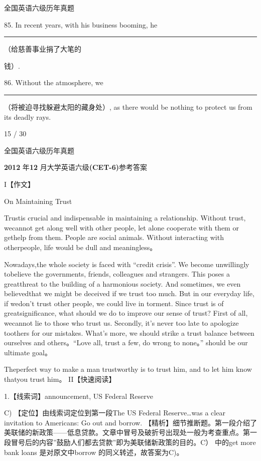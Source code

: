 \documentclass[UTF8,11pt]{ctexart}
\begin{document}
全国英语六级历年真题


85. In recent years, with his business booming, he \par\noindent\rule{.95\linewidth}{.4pt}\par  （给慈善事业捐了大笔的


钱）.


86. Without the atmosphere, we\par\noindent\rule{.95\linewidth}{.4pt}\par  （将被迫寻找躲避太阳的藏身处）, as there would be nothing to protect us from its deadly rays.


15 / 30


全国英语六级历年真题


\textbf{2012} 年\textbf{12} 月大学英语六级\textbf{(CET-6)}参考答案


I【作文】


On Maintaining Trust


Trustis crucial and indispensable in maintaining a relationship. Without trust, wecannot get along well with other people, let alone cooperate with them or gethelp from them. People are social animals. Without interacting with otherpeople, life would be dull and meaningless。


Nowadays,the whole society is faced with “credit crisis”. We become unwillingly tobelieve the governments, friends, colleagues and strangers. This poses a greatthreat to the building of a harmonious society. And sometimes, we even believedthat we might be deceived if we trust too much. But in our everyday life, if wedon’t trust other people, we could live in torment. Since trust is of greatsignificance, what should we do to improve our sense of trust? First of all, wecannot lie to those who trust us. Secondly, it’s never too late to apologize toothers for our mistakes. What’s more, we should strike a trust balance between ourselves and others。“Love all, trust a few, do wrong to none。” should be our ultimate goal。


Theperfect way to make a man trustworthy is to trust him, and to let him know thatyou trust him。 II【快速阅读】


1.【线索词】announcement, US Federal Reserve


C) 【定位】由线索词定位到第一段The US Federal Reserve…was a clear invitation to Americans: Go out and borrow. 【精析】细节推断题。第一段介绍了美联储的新政策——低息贷款。文章中冒号及破折号出现处一般为考查重点。第一段冒号后的内容”鼓励人们都去贷款”即为美联储新政策的目的。C） 中的get more bank loans 是对原文中borrow 的同义转述，故答案为C)。
\end{document}
